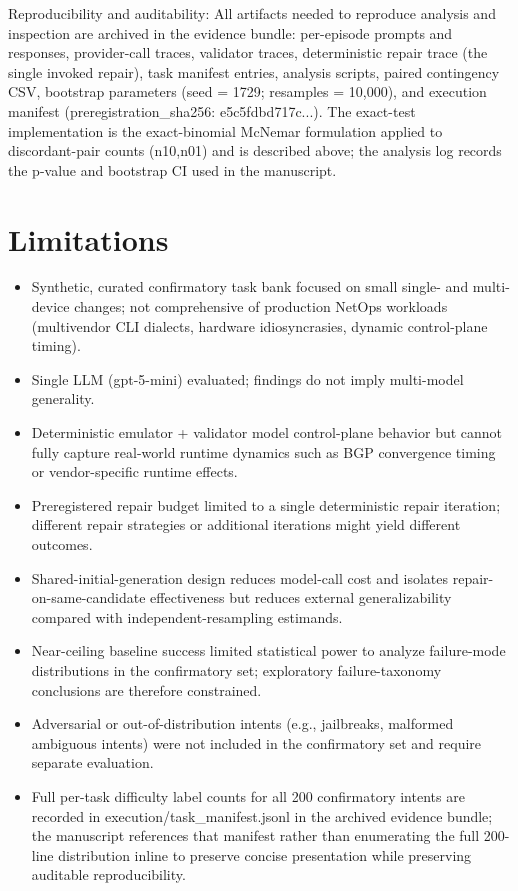 \documentclass[conference]{IEEEtran}
\begin{document}
Reproducibility and auditability: All artifacts needed to reproduce analysis and inspection are archived in the evidence bundle: per-episode prompts and responses, provider-call traces, validator traces, deterministic repair trace (the single invoked repair), task manifest entries, analysis scripts, paired contingency CSV, bootstrap parameters (seed = 1729; resamples = 10,000), and execution manifest (preregistration\_sha256: e5c5fdbd717c...). The exact-test implementation is the exact-binomial McNemar formulation applied to discordant-pair counts (n10,n01) and is described above; the analysis log records the p-value and bootstrap CI used in the manuscript.

\section{Limitations}
\begin{itemize}
\item Synthetic, curated confirmatory task bank focused on small single- and multi-device changes; not comprehensive of production NetOps workloads (multivendor CLI dialects, hardware idiosyncrasies, dynamic control-plane timing).
\item Single LLM (gpt-5-mini) evaluated; findings do not imply multi-model generality.
\item Deterministic emulator + validator model control-plane behavior but cannot fully capture real-world runtime dynamics such as BGP convergence timing or vendor-specific runtime effects.
\item Preregistered repair budget limited to a single deterministic repair iteration; different repair strategies or additional iterations might yield different outcomes.
\item Shared-initial-generation design reduces model-call cost and isolates repair-on-same-candidate effectiveness but reduces external generalizability compared with independent-resampling estimands.
\item Near-ceiling baseline success limited statistical power to analyze failure-mode distributions in the confirmatory set; exploratory failure-taxonomy conclusions are therefore constrained.
\item Adversarial or out-of-distribution intents (e.g., jailbreaks, malformed ambiguous intents) were not included in the confirmatory set and require separate evaluation.
\item Full per-task difficulty label counts for all 200 confirmatory intents are recorded in execution/task\_manifest.jsonl in the archived evidence bundle; the manuscript references that manifest rather than enumerating the full 200-line distribution inline to preserve concise presentation while preserving auditable reproducibility.
\end{itemize}
\end{document}
